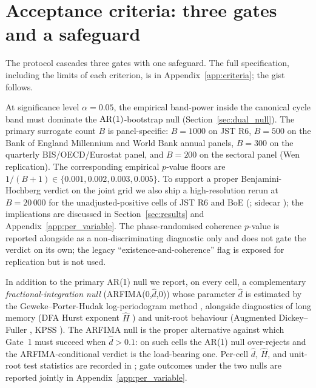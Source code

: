 \section{Acceptance criteria: three gates and a safeguard}
\label{sec:criteria}

The protocol cascades three gates with one safeguard. The full
specification, including the limits of each criterion, is in
Appendix~\ref{app:criteria}; the gist follows.

\begin{gate}[Existence]
\label{gate:1}
At significance level \(\alpha=0.05\), the empirical band-power
inside the canonical cycle band must dominate the
\(\mathrm{AR}(1)\)-bootstrap null (Section~\ref{sec:dual_null}). The
primary surrogate count \(B\) is panel-specific: \(B=1000\) on
JST R6, \(B=500\) on the Bank of England Millennium and World
Bank annual panels, \(B=300\) on the quarterly BIS/OECD/Eurostat
panel, and \(B=200\) on the sectoral panel (Wen replication).
The corresponding empirical \(p\)-value floors are
\(1/(B+1) \in \{0.001, 0.002, 0.003, 0.005\}\). To support a
proper Benjamini-Hochberg verdict on the joint grid we also
ship a high-resolution rerun at \(B=20\,000\) for the
unadjusted-positive cells of JST R6 and BoE
(;
sidecar ); the
implications are discussed in Section~\ref{sec:results} and
Appendix~\ref{app:per_variable}. The phase-randomised
coherence \(p\)-value is reported alongside as a
non-discriminating diagnostic only and does not gate the
verdict on its own; the legacy
``existence-and-coherence'' flag is exposed for replication but
is not used.

In addition to the primary AR(1) null we report, on every cell,
a complementary \emph{fractional-integration null} (ARFIMA(0,\(\hat
d\),0)) whose parameter \(\hat d\) is estimated by the
Geweke--Porter-Hudak log-periodogram method
\citep{geweke_porter_hudak1983}, alongside diagnostics of long
memory (DFA Hurst exponent \(\hat H\)
\citep{peng1994,hurst1951}) and unit-root behaviour
(Augmented Dickey--Fuller \citep{dickey_fuller1979}, KPSS
\citep{kpss1992}). The ARFIMA null is the proper alternative
against which Gate~1 must succeed when \(\hat d > 0.1\): on
such cells the AR(1) null over-rejects and the
ARFIMA-conditional verdict is the load-bearing one. Per-cell
\(\hat d\), \(\hat H\), and unit-root test statistics are
recorded in ;
gate outcomes under the two nulls are reported jointly in
Appendix~\ref{app:per_variable}.
\end{gate}


